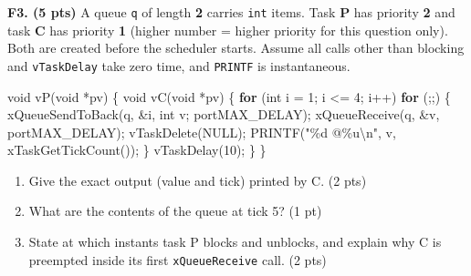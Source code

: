 \documentclass[
  11pt,
]{article}
\newenvironment{Shaded}{}{}
\newcommand{\ControlFlowTok}[1]{\textcolor[rgb]{0.00,0.44,0.13}{\textbf{#1}}}
\newcommand{\DataTypeTok}[1]{\textcolor[rgb]{0.56,0.13,0.00}{#1}}
\newcommand{\DecValTok}[1]{\textcolor[rgb]{0.25,0.63,0.44}{#1}}
\newcommand{\NormalTok}[1]{#1}
\newcommand{\OperatorTok}[1]{\textcolor[rgb]{0.40,0.40,0.40}{#1}}
\newcommand{\SpecialCharTok}[1]{\textcolor[rgb]{0.25,0.44,0.63}{#1}}
\newcommand{\StringTok}[1]{\textcolor[rgb]{0.25,0.44,0.63}{#1}}
\providecommand{\tightlist}{%
  \setlength{\itemsep}{0pt}\setlength{\parskip}{0pt}}
\begin{document}
\textbf{F3. (5 pts)} A queue \texttt{q} of length \textbf{2} carries
\texttt{int} items. Task \textbf{P} has priority \textbf{2} and task
\textbf{C} has priority \textbf{1} (higher number = higher priority for
this question only). Both are created before the scheduler starts.
Assume all calls other than blocking and \texttt{vTaskDelay} take zero
time, and \texttt{PRINTF} is instantaneous.

\begin{Shaded}
\begin{Highlighting}[]
\DataTypeTok{void}\NormalTok{ vP}\OperatorTok{(}\DataTypeTok{void} \OperatorTok{*}\NormalTok{pv}\OperatorTok{)} \OperatorTok{\{}                  \DataTypeTok{void}\NormalTok{ vC}\OperatorTok{(}\DataTypeTok{void} \OperatorTok{*}\NormalTok{pv}\OperatorTok{)} \OperatorTok{\{}
    \ControlFlowTok{for} \OperatorTok{(}\DataTypeTok{int}\NormalTok{ i }\OperatorTok{=} \DecValTok{1}\OperatorTok{;}\NormalTok{ i }\OperatorTok{\textless{}=} \DecValTok{4}\OperatorTok{;}\NormalTok{ i}\OperatorTok{++)}         \ControlFlowTok{for} \OperatorTok{(;;)} \OperatorTok{\{}
\NormalTok{        xQueueSendToBack}\OperatorTok{(}\NormalTok{q}\OperatorTok{,} \OperatorTok{\&}\NormalTok{i}\OperatorTok{,}              \DataTypeTok{int}\NormalTok{ v}\OperatorTok{;}
\NormalTok{                         portMAX\_DELAY}\OperatorTok{);}\NormalTok{     xQueueReceive}\OperatorTok{(}\NormalTok{q}\OperatorTok{,} \OperatorTok{\&}\NormalTok{v}\OperatorTok{,}\NormalTok{ portMAX\_DELAY}\OperatorTok{);}
\NormalTok{    vTaskDelete}\OperatorTok{(}\NormalTok{NULL}\OperatorTok{);}\NormalTok{                       PRINTF}\OperatorTok{(}\StringTok{"}\SpecialCharTok{\%d}\StringTok{ @}\SpecialCharTok{\%u\textbackslash{}n}\StringTok{"}\OperatorTok{,}\NormalTok{ v}\OperatorTok{,}\NormalTok{ xTaskGetTickCount}\OperatorTok{());}
\OperatorTok{\}}\NormalTok{                                            vTaskDelay}\OperatorTok{(}\DecValTok{10}\OperatorTok{);}
                                         \OperatorTok{\}}
                                     \OperatorTok{\}}
\end{Highlighting}
\end{Shaded}

\begin{enumerate}
\def\labelenumi{\alph{enumi}.}
\tightlist
\item
  Give the exact output (value and tick) printed by C. (2 pts)
\item
  What are the contents of the queue at tick 5? (1 pt)
\item
  State at which instants task P blocks and unblocks, and explain why C
  is preempted inside its first \texttt{xQueueReceive} call. (2 pts)
\end{enumerate}
\end{document}
